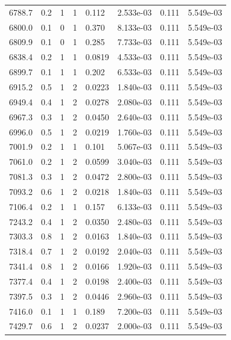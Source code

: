 \documentclass[preview]{standalone}
\begin{document}
{{{{{{{{{{\begin{tabular}{L{1.2cm}C{1.2cm} C{0.3cm}C{0.5cm} C{1.4cm}C{1.4cm} C{1.4cm}C{1.4cm}}
  6788.7  &   0.2  & 1     &  1 &  0.112  & 2.533e-03  & 0.111 &  5.549e-03   \\ 
  6800.0  &   0.1  & 0     &  1 &  0.370  & 8.133e-03  & 0.111 &  5.549e-03   \\ 
  6809.9  &   0.1  & 0     &  1 &  0.285  & 7.733e-03  & 0.111 &  5.549e-03   \\ 
  6838.4  &   0.2  & 1     &  1 &  0.0819  & 4.533e-03  & 0.111 &  5.549e-03   \\ 
  6899.7  &   0.1  & 1     &  1 &  0.202  & 6.533e-03  & 0.111 &  5.549e-03   \\ 
  6915.2  &   0.5  & 1     &  2 &  0.0223  & 1.840e-03  & 0.111 &  5.549e-03   \\ 
  6949.4  &   0.4  & 1     &  2 &  0.0278  & 2.080e-03  & 0.111 &  5.549e-03   \\ 
  6967.3  &   0.3  & 1     &  2 &  0.0450  & 2.640e-03  & 0.111 &  5.549e-03   \\ 
  6996.0  &   0.5  & 1     &  2 &  0.0219  & 1.760e-03  & 0.111 &  5.549e-03   \\ 
  7001.9  &   0.2  & 1     &  1 &  0.101  & 5.067e-03  & 0.111 &  5.549e-03   \\ 
  7061.0  &   0.2  & 1     &  2 &  0.0599  & 3.040e-03  & 0.111 &  5.549e-03   \\ 
  7081.3  &   0.3  & 1     &  2 &  0.0472  & 2.800e-03  & 0.111 &  5.549e-03   \\ 
  7093.2  &   0.6  & 1     &  2 &  0.0218  & 1.840e-03  & 0.111 &  5.549e-03   \\ 
  7106.4  &   0.2  & 1     &  1 &  0.157  & 6.133e-03  & 0.111 &  5.549e-03   \\ 
  7243.2  &   0.4  & 1     &  2 &  0.0350  & 2.480e-03  & 0.111 &  5.549e-03   \\ 
  7303.3  &   0.8  & 1     &  2 &  0.0163  & 1.840e-03  & 0.111 &  5.549e-03   \\ 
  7318.4  &   0.7  & 1     &  2 &  0.0192  & 2.040e-03  & 0.111 &  5.549e-03   \\ 
  7341.4  &   0.8  & 1     &  2 &  0.0166  & 1.920e-03  & 0.111 &  5.549e-03   \\ 
  7377.4  &   0.4  & 1     &  2 &  0.0198  & 2.400e-03  & 0.111 &  5.549e-03   \\ 
  7397.5  &   0.3  & 1     &  2 &  0.0446  & 2.960e-03  & 0.111 &  5.549e-03   \\ 
  7416.0  &   0.1  & 1     &  1 &  0.189  & 7.200e-03  & 0.111 &  5.549e-03   \\ 
  7429.7  &   0.6  & 1     &  2 &  0.0237  & 2.000e-03  & 0.111 &  5.549e-03   \\ 

\end{tabular}}}}}}}}}}}
\end{document}
